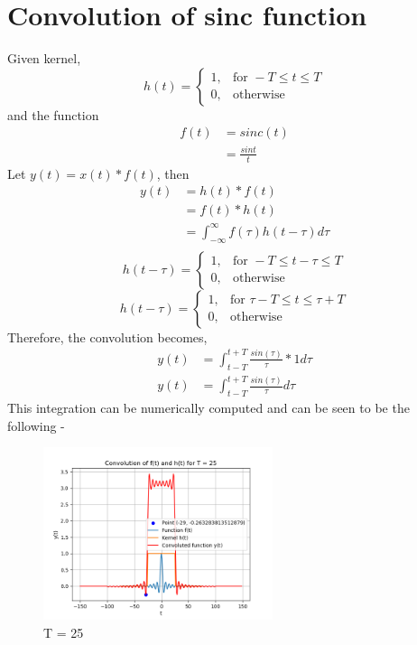 \documentclass[12pt]{article}
\begin{document}
\section{Convolution of sinc function}

Given kernel, 
\[
h(t) =
\begin{cases}
1, & \text{for } -T \leq t \leq T \\
0, & \text{otherwise}
\end{cases}
\]
and the function 
\begin{align*}
f(t) &= sinc(t) \\
     &= \frac{sint}{t}
\end{align*}
Let $y(t) = x(t) * f(t)$, then
\begin{align*}
	y(t) &= h(t) * f(t) \\
             &= f(t) * h(t) \\
             &= \int_{-\infty}^{\infty} f(\tau) h(t - \tau) d \tau \\
\end{align*}
\[
h(t - \tau) =
\begin{cases}
1, & \text{for } -T \leq t - \tau \leq T \\
0, & \text{otherwise}
\end{cases}
\]
\[
h(t - \tau) =
\begin{cases}
1, & \text{for } \tau - T \leq t \leq \tau + T \\
0, & \text{otherwise}
\end{cases}
\]
Therefore, the convolution becomes, 
\begin{align*}
	y(t) &= \int_{t - T}^{t + T} \frac{sin(\tau)}{\tau} * 1 d\tau \\
	y(t) &= \int_{t - T}^{t + T} \frac{sin(\tau)}{\tau} d\tau
\end{align*}
This integration can be numerically computed and can be seen to be the following - \\
\begin{figure}[!ht]
    \centering
    \includegraphics[width=0.6\textwidth]{Conv_sinc.png}
    \caption{T = 25}
    \label{fig:conv_sinc}
\end{figure}
\end{document}
